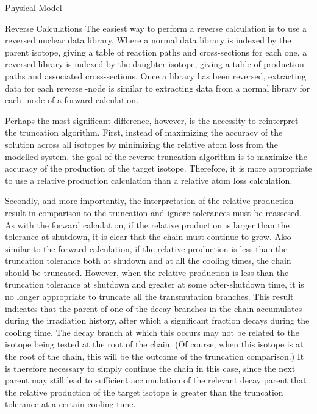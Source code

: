 \begin{chapter}{Physical Model\label{chap:physical}}
\begin{section}{Reverse Calculations}
  The easiest way to perform a reverse calculation is to use a
  reversed nuclear data library.  Where a normal data library is
  indexed by the parent isotope, giving a table of reaction paths and
  cross-sections for each one, a reversed library is indexed by the
  daughter isotope, giving a table of production paths and associated
  cross-sections.  Once a library has been reversed, extracting data
  for each reverse \pc-node is similar to extracting data from a
  normal library for each \pc-node of a forward calculation.
  
  Perhaps the most significant difference, however, is the necessity
  to reinterpret the truncation algorithm.  First, instead of
  maximizing the accuracy of the solution across all isotopes by
  minimizing the relative atom loss from the modelled system, the goal
  of the reverse truncation algorithm is to maximize the accuracy of
  the production of the target isotope.  Therefore, it is more
  appropriate to use a relative production calculation than a relative
  atom loss calculation.  
  
  Secondly, and more importantly, the interpretation of the relative
  production result in comparison to the truncation and ignore
  tolerances must be reassesed.  As with the forward calculation, if
  the relative production is larger than the tolerance at shutdown, it
  is clear that the chain must continue to grow.  Also similar to the
  forward calculation, if the relative production is less than the
  truncation tolerance both at shudown and at all the cooling times,
  the chain should be truncated.  However, when the relative
  production is less than the truncation tolerance at shutdown and
  greater at some after-shutdown time, it is no longer appropriate to
  truncate all the transmutation branches.  This result indicates that
  the parent of one of the decay branches in the chain accumulates
  during the irradiation history, after which a significant fraction
  decays during the cooling time.  The decay branch at which this
  occurs may not be related to the isotope being tested at the root of
  the chain.  (Of course, when this isotope is at the root of the
  chain, this will be the outcome of the truncation comparison.)  It
  is therefore necessary to simply continue the chain in this case,
  since the next parent may still lead to sufficient accumulation of
  the relevant decay parent that the relative production of the target
  isotope is greater than the truncation tolerance at a certain
  cooling time.
  

\end{section}
\end{chapter}
